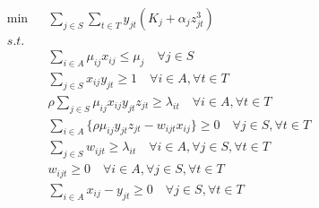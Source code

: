 \documentclass[11pt,english]{article}
\begin{document}
\begin{eqnarray}
  \min &&  \sum_{j\in S}\sum_{t\in T} y_{jt}(K_j + \alpha_j z_{jt}^3)  \nonumber \\
  s.t.&& \nonumber \\
  &&\sum_{i \in A} \mu_{ij}x_{ij} \le  \mu_j \quad \forall j\in S \label{const_01} \\
  && \sum_{j \in S} x_{ij}y_{jt} \ge 1 \quad \forall i \in A, \forall t \label{const_02} \in T \\
  && \rho \sum_{j\in S} \mu_{ij}x_{ij} y_{jt}z_{jt} \ge \lambda_{it} \quad \forall i\in A, \forall t\in T \label{const_03} \\
  && \sum_{i\in A} \{\rho \mu_{ij} y_{jt} z_{jt} -  w_{ijt}x_{ij}\} \ge 0 \quad \forall j\in   S, \forall t\in T \label{const_04}\\
  && \sum_{j\in S} w_{ijt} \ge \lambda_{it} \quad \forall i\in A, \forall j \in S, \forall t\in T \label{const_05}\\
  && w_{ijt} \ge 0 \quad \forall i\in A, \forall j \in S, \forall t\in T \label{const_06}\\
  && \sum_{i\in A} x_{ij} -y_{jt} \ge 0 \quad \forall j \in S, \forall t\in T \label{const_07}
\end{eqnarray}
\end{document}
